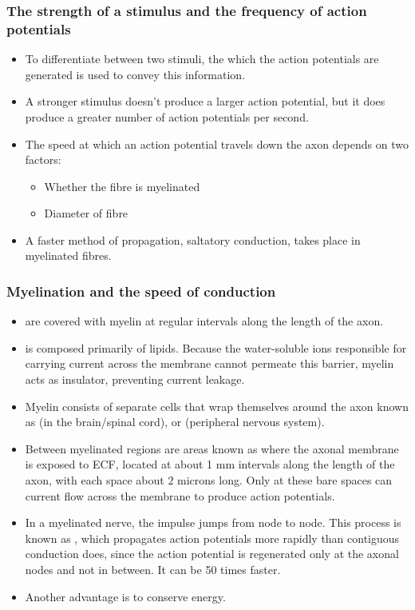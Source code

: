\documentclass{article}
\numberwithin{equation}{section}
\begin{document}
\subsubsection{The strength of a stimulus and the frequency of action potentials}
\begin{itemize}
    \item To differentiate between two stimuli, the  which the action potentials are generated is used to convey this information.
    \item A stronger stimulus doesn't produce a larger action potential, but it does produce a greater number of action potentials per second.
    \item The speed at which an action potential travels down the axon depends on two factors:
    \begin{itemize}
        \item Whether the fibre is myelinated
        \item Diameter of fibre
    \end{itemize}
    \item A faster method of propagation, saltatory conduction, takes place in myelinated fibres.
\end{itemize}
\subsubsection{Myelination and the speed of conduction}
\begin{itemize}
    \item {} are covered with myelin at regular intervals along the length of the axon.
    \item {} is composed primarily of lipids. Because the water-soluble ions responsible for carrying current across the membrane cannot permeate this barrier, myelin acts as insulator, preventing current leakage.
    \item Myelin consists of separate cells that wrap themselves around the axon known as  (in the brain/spinal cord), or  (peripheral nervous system).
    \item Between myelinated regions are areas known as  where the axonal membrane is exposed to ECF, located at about 1 mm  intervals along the length of the axon, with each space about $2$ microns long. Only at these bare spaces can current flow across the membrane to produce action potentials.
    \item In a myelinated nerve, the impulse jumps from node to node. This process is known as , which propagates action potentials more rapidly than contiguous conduction does, since the action potential is regenerated only at the axonal nodes and not in between. It can be 50 times faster.
    \item Another advantage is to conserve energy.
\end{itemize}
\end{document}
